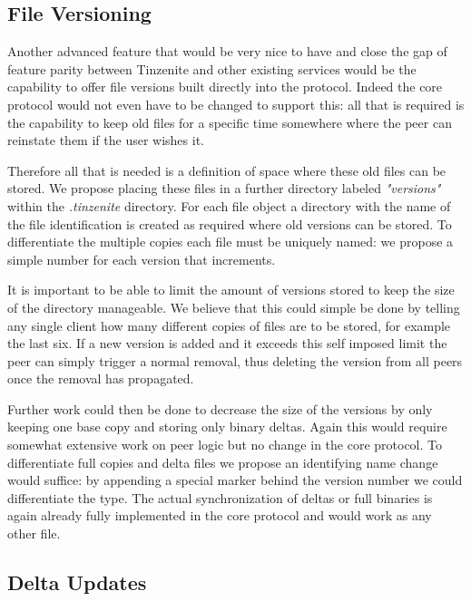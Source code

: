 \subsection{File Versioning}
\label{sub:File Versioning}

Another advanced feature that would be very nice to have and close the gap of feature parity between Tinzenite and other existing services would be the capability to offer file versions built directly into the protocol.
Indeed the core protocol would not even have to be changed to support this: all that is required is the capability to keep old files for a specific time somewhere where the peer can reinstate them if the user wishes it.

Therefore all that is needed is a definition of space where these old files can be stored.
We propose placing these files in a further directory labeled \textit{"versions"} within the \textit{.tinzenite} directory.
For each file object a directory with the name of the file identification is created as required where old versions can be stored.
To differentiate the multiple copies each file must be uniquely named: we propose a simple number for each version that increments.

It is important to be able to limit the amount of versions stored to keep the size of the directory manageable.
We believe that this could simple be done by telling any single client how many different copies of files are to be stored, for example the last six.
If a new version is added and it exceeds this self imposed limit the peer can simply trigger a normal removal, thus deleting the version from all peers once the removal has propagated.

Further work could then be done to decrease the size of the versions by only keeping one base copy and storing only binary deltas.
Again this would require somewhat extensive work on peer logic but no change in the core protocol.
To differentiate full copies and delta files we propose an identifying name change would suffice: by appending a special marker behind the version number we could differentiate the type.
The actual synchronization of deltas or full binaries is again already fully implemented in the core protocol and would work as any other file.

\subsection{Delta Updates}
\label{sub:Delta Updates}

